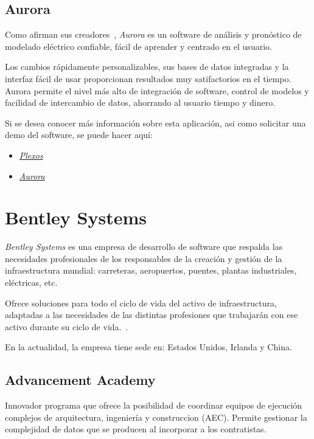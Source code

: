 \subsection{Aurora}

Como afirman sus creadores~\cite{web:EnergyExemplarAurora}, \textit{Aurora} es un software de análisis y pronóstico de modelado eléctrico confiable, fácil de aprender y centrado en el usuario.

Los cambios rápidamente personalizables, sus bases de datos integradas y la interfaz fácil de usar proporcionan resultados muy satifactorios en el tiempo. Aurora permite el nivel más alto de integración de software, control de modelos y facilidad de intercambio de datos, ahorrando al usuario tiempo y dinero.

Si se desea conocer más información sobre esta aplicación, asi como solicitar una demo del software, se puede hacer aquí:

\begin{itemize}
	\item \href{https://energyexemplar.com/products/plexos-simulation-software/}{\textit{Plexos}}
	\item \href{https://energyexemplar.com/products/aurora-electric-modeling-forecasting-software/}{\textit{Aurora}}
\end{itemize}

\section{Bentley Systems}

\textit{Bentley Systems} es una empresa de desarrollo de software que respalda las necesidades profesionales de los responsables de la creación y gestión de la infraestructura mundial: carreteras, aeropuertos, puentes, plantas industriales, eléctricas, etc.

Ofrece soluciones para todo el ciclo de vida del activo de infraestructura, adaptadas a las necesidades de las distintas profesiones que trabajarán con ese activo durante su ciclo de vida.~\cite{web:bentleySystems}.

En la actualidad, la empresa tiene sede en: Estados Unidos, Irlanda y China.
\subsection{Advancement Academy}

Innovador programa que ofrece la posibilidad de coordinar equipos de ejecución complejos de arquitectura, ingeniería y construccion (AEC). Permite gestionar la complejidad de datos que se producen al incorporar a los contratistas.

